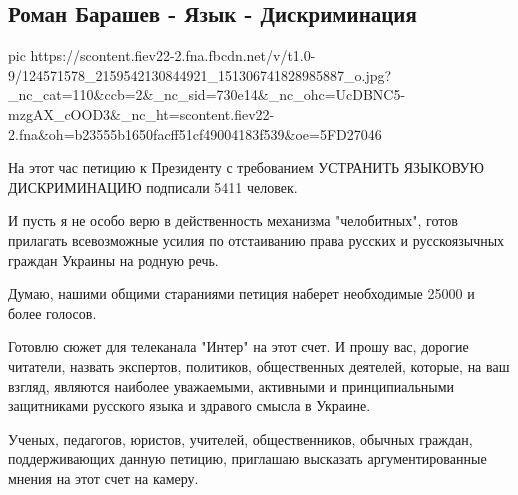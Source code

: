  
 
 

\subsection{Роман Барашев - Язык - Дискриминация}
\label{sec:09_11_2020.fb.roman_barashev.1.jazyk_discrimination}

\ifcmt
pic https://scontent.fiev22-2.fna.fbcdn.net/v/t1.0-9/124571578_2159542130844921_151306741828985887_o.jpg?_nc_cat=110&ccb=2&_nc_sid=730e14&_nc_ohc=UcDBNC5-mzgAX_cOOD3&_nc_ht=scontent.fiev22-2.fna&oh=b23555b1650facff51cf49004183f539&oe=5FD27046
\fi

На этот час петицию к Президенту с требованием УСТРАНИТЬ ЯЗЫКОВУЮ ДИСКРИМИНАЦИЮ
подписали 5411 человек.

И пусть я не особо верю в действенность механизма "челобитных", готов прилагать
всевозможные усилия по отстаиванию права русских и русскоязычных граждан
Украины на родную речь.

Думаю, нашими общими стараниями петиция наберет необходимые 25000 и более
голосов.

Готовлю сюжет для телеканала "Интер" на этот счет. И прошу вас, дорогие
читатели, назвать экспертов, политиков, общественных деятелей, которые, на ваш
взгляд, являются наиболее уважаемыми, активными и принципиальными защитниками
русского языка и здравого смысла в Украине. 

Ученых, педагогов, юристов, учителей, общественников, обычных граждан,
поддерживающих данную петицию, приглашаю высказать аргументированные мнения на
этот счет на камеру.

